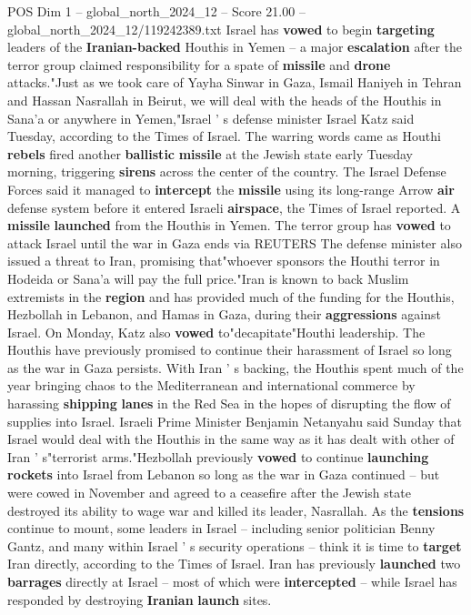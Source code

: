 \begin{textsample}{POS Dim 1 – global\_north\_2024\_12 – Score 21.00 – global\_north\_2024\_12/119242389.txt}  \label{ex:f1_pos_265}
Israel has \textbf{vowed} to begin \textbf{targeting} leaders of the \textbf{Iranian-backed} Houthis in Yemen -- a major \textbf{escalation} after the terror group claimed responsibility for a spate of \textbf{missile} and \textbf{drone} attacks."Just as we took care of Yayha Sinwar in Gaza, Ismail Haniyeh in Tehran and Hassan Nasrallah in Beirut, we will deal with the heads of the Houthis in Sana'a or anywhere in Yemen,"Israel ' s defense minister Israel Katz said Tuesday, according to the Times of Israel.
The warring words came as Houthi \textbf{rebels} fired another \textbf{ballistic} \textbf{missile} at the Jewish state early Tuesday morning, triggering \textbf{sirens} across the center of the country.
The Israel Defense Forces said it managed to \textbf{intercept} the \textbf{missile} using its long-range Arrow \textbf{air} defense system before it entered Israeli \textbf{airspace}, the Times of Israel reported.
A \textbf{missile} \textbf{launched} from the Houthis in Yemen.
The terror group has \textbf{vowed} to attack Israel until the war in Gaza ends via REUTERS The defense minister also issued a threat to Iran, promising that"whoever sponsors the Houthi terror in Hodeida or Sana'a will pay the full price."Iran is known to back Muslim extremists in the \textbf{region} and has provided much of the funding for the Houthis, Hezbollah in Lebanon, and Hamas in Gaza, during their \textbf{aggressions} against Israel.
On Monday, Katz also \textbf{vowed} to"decapitate"Houthi leadership.
The Houthis have previously promised to continue their harassment of Israel so long as the war in Gaza persists.
With Iran ' s backing, the Houthis spent much of the year bringing chaos to the Mediterranean and international commerce by harassing \textbf{shipping} \textbf{lanes} in the Red Sea in the hopes of disrupting the flow of supplies into Israel.
Israeli Prime Minister Benjamin Netanyahu said Sunday that Israel would deal with the Houthis in the same way as it has dealt with other of Iran ' s"terrorist arms."Hezbollah previously \textbf{vowed} to continue \textbf{launching} \textbf{rockets} into Israel from Lebanon so long as the war in Gaza continued -- but were cowed in November and agreed to a ceasefire after the Jewish state destroyed its ability to wage war and killed its leader, Nasrallah.
As the \textbf{tensions} continue to mount, some leaders in Israel -- including senior politician Benny Gantz, and many within Israel ' s security operations -- think it is time to \textbf{target} Iran directly, according to the Times of Israel.
Iran has previously \textbf{launched} two \textbf{barrages} directly at Israel -- most of which were \textbf{intercepted} -- while Israel has responded by destroying \textbf{Iranian} \textbf{launch} sites.

\end{textsample}
